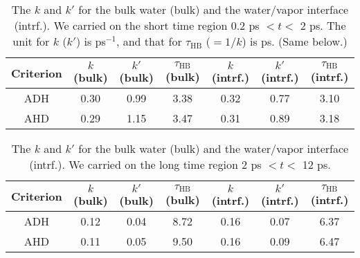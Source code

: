 \begin{table}[htb]
\centering
\caption{\label{tab:k_k_prime_128w_pure_1} 
    The $k$ and $k'$ for the bulk water (bulk) and the water/vapor interface (intrf.). We carried on the short time region 0.2 ps $< t <$ 2 ps. 
    The unit for $k$ ($k'$) is ps$^{-1}$, and that for $\tau_{\text{HB}}$ ($=1/k$) is ps. (Same below.)
} 
\begin{tabular}{ccccccc}
 Criterion & $k$  (bulk) & $k'$ (bulk) & $\tau_{\text{HB}}$ (bulk) & $k$  (intrf.) & $k'$ (intrf.) & $\tau_{\text{HB}}$ (intrf.)\\
\hline
  ADH & 0.30  & 0.99 & 3.38  & 0.32 & 0.77 & 3.10 \\
  AHD & 0.29 & 1.15 & 3.47 & 0.31 & 0.89 & 3.18 \\
\end{tabular}
\end{table}
%
\begin{table}[htb]
\centering
\caption{\label{tab:k_k_prime_128w_pure_2} 
    The $k$ and $k'$ for the bulk water (bulk) and the water/vapor interface (intrf.). We carried on the long time region 2 ps $< t <$ 12 ps.
} 
\begin{tabular}{ccccccc}
 Criterion & $k$  (bulk) & $k'$ (bulk) & $\tau_{\text{HB}}$ (bulk) & $k$  (intrf.) & $k'$ (intrf.) & $\tau_{\text{HB}}$ (intrf.)\\
\hline
  ADH & 0.12  & 0.04 & 8.72 & 0.16  & 0.07 & 6.37\\
  AHD & 0.11  & 0.05 & 9.50 & 0.16  & 0.09 & 6.47 \\
\end{tabular}
\end{table}
% 

